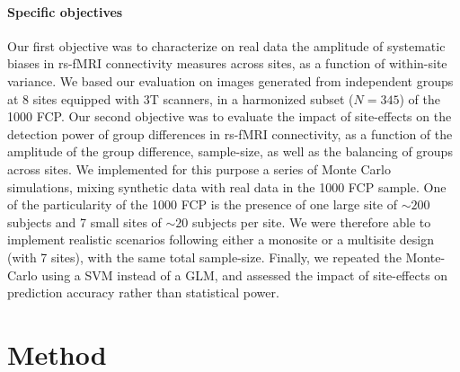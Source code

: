 \documentclass[authoryear]{elsarticle}
\begin{document}
\paragraph{Specific objectives}
Our first objective was to characterize on real data the amplitude of systematic biases in rs-fMRI connectivity measures across sites, as a function of within-site variance. We based our evaluation on images generated from independent groups at 8 sites equipped with 3T scanners, in a harmonized subset ($N=345$) of the 1000 FCP. Our second objective was to evaluate the impact of site-effects on the detection power of group differences in rs-fMRI connectivity, as a function of the amplitude of the group difference, sample-size, as well as the balancing of groups across sites. We implemented for this purpose a series of Monte Carlo simulations, mixing synthetic data with real data in the 1000 FCP sample. One of the particularity of the 1000 FCP is the presence of one large site of $\sim200$ subjects and 7 small sites of $\sim20$ subjects per site. We were therefore able to implement realistic scenarios following either a monosite or a multisite design (with 7 sites), with the same total sample-size. Finally, we repeated the Monte-Carlo using a SVM instead of a GLM, and assessed the impact of site-effects on prediction accuracy rather than statistical power.

\section{Method}
\end{document}
